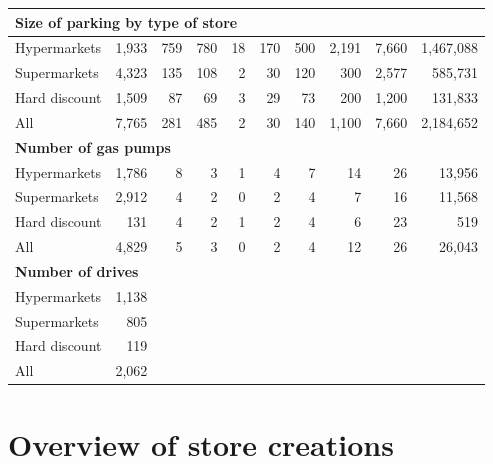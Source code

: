 \documentclass[11pt]{article}
\begin{document}
\begin{table}[H]
\begin{tabular}{lrrrrrrrrr}
\multicolumn{10}{l}{\textbf{Size of parking by type of store}} \\
\midrule
Hypermarkets  &      1,933 &        759 &        780 &         18 &        170 &        500 &      2,191 &      7,660 &  1,467,088 \\
Supermarkets  &      4,323 &        135 &        108 &          2 &         30 &        120 &        300 &      2,577 &    585,731 \\
Hard discount &      1,509 &         87 &         69 &          3 &         29 &         73 &        200 &      1,200 &    131,833 \\
\midrule
All           &      7,765 &        281 &        485 &          2 &         30 &        140 &      1,100 &      7,660 &  2,184,652 \\
\midrule

\multicolumn{10}{l}{\textbf{Number of gas pumps}} \\
\midrule
Hypermarkets  &      1,786 &          8 &          3 &          1 &          4 &          7 &         14 &         26 &     13,956 \\
Supermarkets  &      2,912 &          4 &          2 &          0 &          2 &          4 &          7 &         16 &     11,568 \\
Hard discount &        131 &          4 &          2 &          1 &          2 &          4 &          6 &         23 &        519 \\
\midrule
All           &      4,829 &          5 &          3 &          0 &          2 &          4 &         12 &         26 &     26,043 \\
\midrule

\multicolumn{10}{l}{\textbf{Number of drives}} \\
\midrule
Hypermarkets  &   1,138 & \multicolumn{8}{c}{} \\
Supermarkets  &   805 & \multicolumn{8}{c}{} \ \\
Hard discount  &   119 & \multicolumn{8}{c}{} \ \\
\midrule
All           &    2,062& \multicolumn{8}{c}{}  \\
\bottomrule

\end{tabular}

\end{table}

\section{Overview of store creations}
\end{document}

